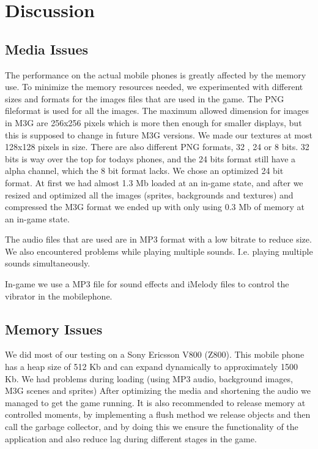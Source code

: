 \documentclass{acmsiggraph}               %
\begin{document}
\section{Discussion}

\subsection{Media Issues}
The performance on the actual mobile phones is greatly affected by the memory use.
To minimize the memory resources needed, we experimented with different sizes and 
formats for the images files that are used in the game. The PNG fileformat is used
for all the images. The maximum allowed dimension for images in M3G are 256x256 pixels 
which is more then enough for smaller displays, but this is supposed to change in 
future M3G versions. We made our textures at most 128x128 pixels in size. There are 
also different PNG formats, 32 , 24 or 8 bits. 32 bits is way over the top for todays
phones, and the 24 bits format still have a alpha channel, which the 8 bit format lacks. 
We chose an optimized 24 bit format. At first we had almost 1.3 Mb loaded at an 
in-game state, and after we resized and optimized all the images (sprites, backgrounds
and textures) and compressed the M3G format we ended up with only using 0.3 Mb of memory at an 
in-game state.

The audio files that are used are in MP3 format with a low bitrate to reduce size. We
also encountered problems while playing multiple sounds. I.e. playing multiple sounds simultaneously.

In-game we use a MP3 file for sound effects and iMelody files to control the vibrator
in the mobilephone.

\subsection{Memory Issues}
We did most of our testing on a Sony Ericsson V800 (Z800). This mobile phone has
a heap size of 512 Kb and can expand dynamically to approximately 1500 Kb. We had
problems during loading (using MP3 audio, background images, M3G scenes and sprites)
After optimizing the media and shortening the audio we managed to get the game running.
It is also recommended to release memory at controlled moments, by implementing a
flush method we release objects and then call the garbage collector, and by doing this
we ensure the functionality of the application and also reduce lag during different
stages in the game.




\end{document}
